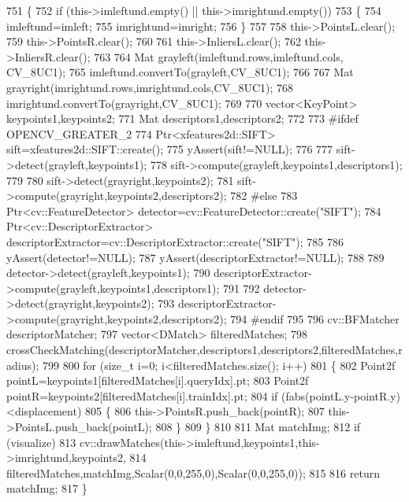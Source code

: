\begin{DoxyCode}
751 \{
752     \textcolor{keywordflow}{if} (this->imleftund.empty() || this->imrightund.empty())
753     \{
754         imleftund=imleft;
755         imrightund=imright;
756     \}
757 
758     this->PointsL.clear();
759     this->PointsR.clear();
760 
761     this->InliersL.clear();
762     this->InliersR.clear();
763 
764     Mat grayleft(imleftund.rows,imleftund.cols, CV\_8UC1);
765     imleftund.convertTo(grayleft,CV\_8UC1);
766 
767     Mat grayright(imrightund.rows,imrightund.cols,CV\_8UC1);
768     imrightund.convertTo(grayright,CV\_8UC1);
769 
770     vector<KeyPoint> keypoints1,keypoints2;
771     Mat descriptors1,descriptors2;
772 
773 \textcolor{preprocessor}{#ifdef OPENCV\_GREATER\_2}
774     Ptr<xfeatures2d::SIFT> sift=xfeatures2d::SIFT::create();
775     yAssert(sift!=NULL);
776 
777     sift->detect(grayleft,keypoints1);
778     sift->compute(grayleft,keypoints1,descriptors1);
779 
780     sift->detect(grayright,keypoints2);
781     sift->compute(grayright,keypoints2,descriptors2);
782 \textcolor{preprocessor}{#else}
783     Ptr<cv::FeatureDetector> detector=cv::FeatureDetector::create(\textcolor{stringliteral}{"SIFT"});
784     Ptr<cv::DescriptorExtractor> descriptorExtractor=cv::DescriptorExtractor::create(\textcolor{stringliteral}{"SIFT"});
785 
786     yAssert(detector!=NULL);
787     yAssert(descriptorExtractor!=NULL);
788 
789     detector->detect(grayleft,keypoints1);
790     descriptorExtractor->compute(grayleft,keypoints1,descriptors1);
791 
792     detector->detect(grayright,keypoints2);
793     descriptorExtractor->compute(grayright,keypoints2,descriptors2);
794 \textcolor{preprocessor}{#endif}
795     
796     cv::BFMatcher descriptorMatcher;
797     vector<DMatch> filteredMatches;
798     crossCheckMatching(descriptorMatcher,descriptors1,descriptors2,filteredMatches,radius);
799 
800     \textcolor{keywordflow}{for} (\textcolor{keywordtype}{size\_t} i=0; i<filteredMatches.size(); i++)
801     \{
802         Point2f pointL=keypoints1[filteredMatches[i].queryIdx].pt;
803         Point2f pointR=keypoints2[filteredMatches[i].trainIdx].pt;
804         \textcolor{keywordflow}{if} (fabs(pointL.y-pointR.y)<displacement)
805         \{
806             this->PointsR.push\_back(pointR);
807             this->PointsL.push\_back(pointL);
808         \}
809     \}
810 
811     Mat matchImg;
812     \textcolor{keywordflow}{if} (visualize)
813         cv::drawMatches(this->imleftund,keypoints1,this->imrightund,keypoints2,
814                 filteredMatches,matchImg,Scalar(0,0,255,0),Scalar(0,0,255,0));
815 
816     \textcolor{keywordflow}{return} matchImg;
817 \}
\end{DoxyCode}
\mbox{\label{classStereoCamera_a3d8fde0cbd4604085b883f22cc606c01}} 
